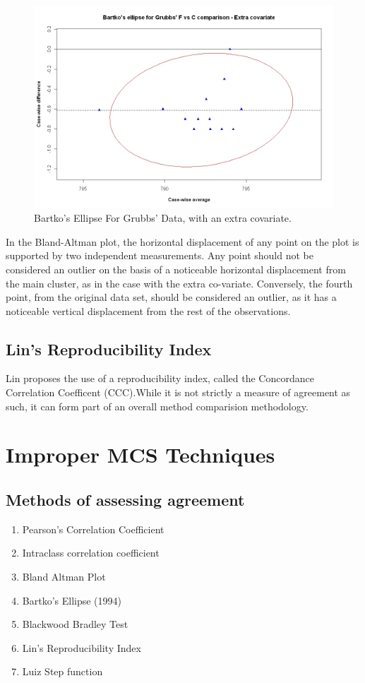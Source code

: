 \documentclass[12pt, a4paper]{report}
\theoremstyle{plain}
\theoremstyle{definition}
\theoremstyle{remark}
\begin{document}
		\begin{figure}[h!]
			\includegraphics[width=130mm]{images/GrubbsBartko2.jpeg}
			\caption{Bartko's Ellipse For Grubbs' Data, with an extra covariate.}\label{GrubbsBartko2}
		\end{figure}
		
		In the Bland-Altman plot, the horizontal displacement of any point on the plot is supported by two independent measurements. Any point should not be considered an outlier on the basis of a noticeable horizontal displacement from the main cluster, as in the case with the extra co-variate. Conversely, the fourth point, from the original data set, should be considered an
		outlier, as it has a noticeable vertical displacement from the rest of the observations.
	\section{Lin's Reproducibility Index} Lin proposes the use of a
	reproducibility index, called the Concordance Correlation
	Coefficent (CCC).While it is not strictly a measure of agreement
	as such, it can form part of an overall method comparision
	methodology.
	\chapter{Improper MCS Techniques}
	
	\section{Methods of assessing agreement}
	
	\begin{enumerate}
		\item Pearson's Correlation Coefficient\item Intraclass
		correlation coefficient \item Bland Altman Plot \item Bartko's
		Ellipse (1994) \item Blackwood Bradley Test \item Lin's
		Reproducibility Index \item Luiz Step function
	\end{enumerate}
	
\end{document}

